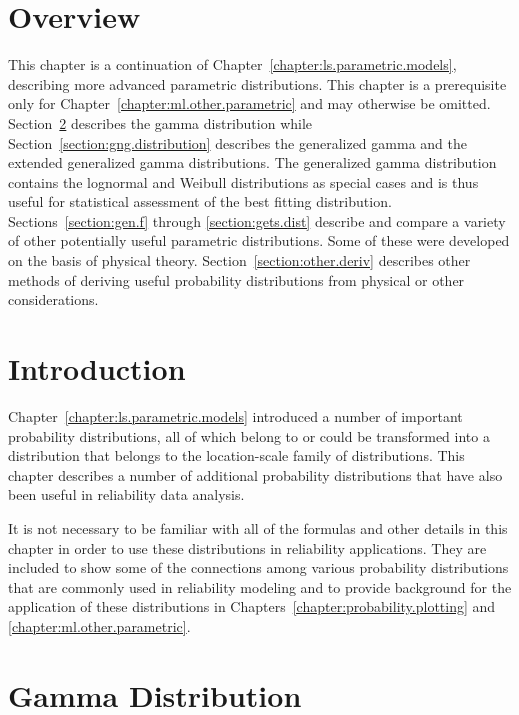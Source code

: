 \section*{Overview}
This chapter is a continuation of
Chapter~\ref{chapter:ls.parametric.models}, describing more advanced
parametric distributions. This chapter is a prerequisite only for
Chapter~\ref{chapter:ml.other.parametric} and may otherwise be
omitted.  Section~\ref{section:gamma.distribution} describes the
gamma distribution while Section~\ref{section:gng.distribution}
describes the generalized gamma and the extended generalized gamma
distributions.  The generalized gamma distribution contains the
lognormal and Weibull distributions as special cases and is thus
useful for statistical assessment of the best fitting distribution.
Sections~\ref{section:gen.f} through \ref{section:gets.dist}
describe and compare a variety of other potentially useful
parametric distributions. Some of these were developed on the basis
of physical theory.  Section~\ref{section:other.deriv} describes
other methods of deriving useful probability distributions from
physical or other considerations.

\section{Introduction}

Chapter~\ref{chapter:ls.parametric.models} introduced a number of
important probability distributions, all of which belong to or could
be transformed into a distribution that belongs to the location-scale
family of distributions.  This chapter describes a number of
additional probability distributions that have also been useful in
reliability data analysis.

It is not necessary to be familiar with all of the formulas and other
details in this chapter in order to use these distributions in
reliability applications. They are included to show some of the
connections among various probability distributions that are commonly
used in reliability modeling and to provide background for the
application of these distributions in
Chapters~\ref{chapter:probability.plotting} and
\ref{chapter:ml.other.parametric}.


\section{Gamma Distribution}
\label{section:gamma.distribution}
